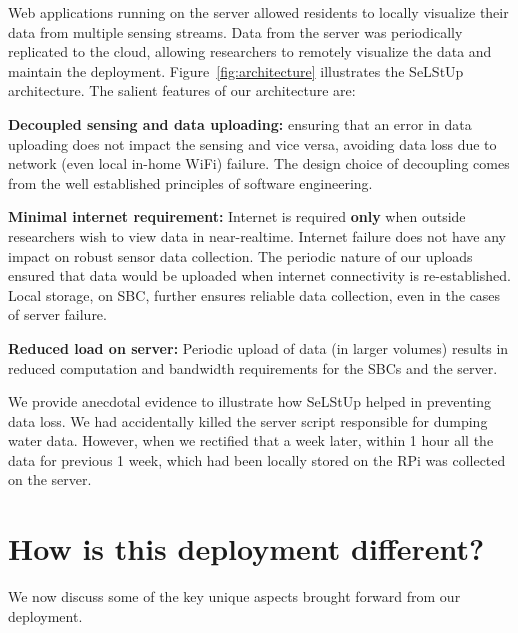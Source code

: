 \documentclass[10pt]{sensys-proc}
\newcommand{\redcolor}[1]{\textcolor{red}{#1}}
\newcommand{\figref}[1]{Figure~\ref{#1}}
\newcommand{\selstups}{SeLStUp }
\begin{document}
Web applications running on the server allowed residents to locally visualize their data from multiple sensing streams. Data from the server was periodically replicated to the cloud, allowing researchers to remotely visualize the data and maintain the deployment. \figref{fig:architecture} illustrates the \selstups architecture. The salient features of our architecture are:


\noindent \textbf{Decoupled sensing and data uploading:} ensuring that an error in data uploading does not impact the sensing and vice versa, avoiding data loss due to network (even local in-home WiFi) failure. The design choice of decoupling comes from the well established principles of software engineering.

\noindent \textbf{Minimal internet requirement:} Internet is required \textbf{only} when outside researchers wish to view data in near-realtime. Internet failure does not have any impact on robust sensor data collection. The periodic nature of our uploads ensured that data would be uploaded when internet connectivity is re-established. Local storage, on SBC, further ensures reliable data collection, even in the cases of server failure. %

\noindent \textbf{Reduced load on server:} Periodic upload of data (in larger volumes) results in reduced computation and bandwidth requirements for the SBCs and the server. 

We provide anecdotal evidence to illustrate how  \selstups helped in preventing data loss. We had accidentally killed the server script responsible for dumping water data. However, when we rectified that a week later, within 1 hour all the data for previous 1 week, which had been locally stored on the RPi was collected on the server. 



\vspace{-1mm}
\section{How is this deployment different?}
\label{sec:learning}
We now discuss some of the key unique aspects brought forward from our deployment. 
\end{document}
